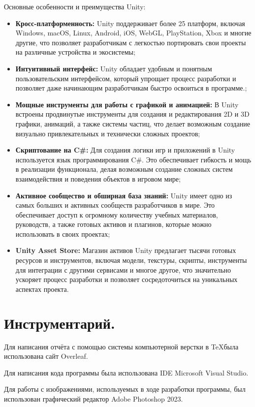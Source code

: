 Основные особенности и преимущества Unity:
\begin{itemize}
    \item \textbf{Кросс-платформенность:} Unity поддерживает более 25 платформ, включая Windows, macOS, Linux, Android, iOS, WebGL, PlayStation, Xbox и многие другие, что позволяет разработчикам с легкостью портировать свои проекты на различные устройства и экосистемы;
    \item \textbf{Интуитивный интерфейс:} Unity обладает удобным и понятным пользовательским интерфейсом, который упрощает процесс разработки и позволяет даже начинающим разработчикам быстро освоиться в программе.;
    \item \textbf{Мощные инструменты для работы с графикой и анимацией:} В Unity встроены продвинутые инструменты для создания и редактирования 2D и 3D графики, анимаций, а также системы частиц, что делает возможным создание визуально привлекательных и технически сложных проектов;
    \item \textbf{Скриптование на C#:} Для создания логики игр и приложений в Unity используется язык программирования C#. Это обеспечивает гибкость и мощь в реализации функционала, делая возможным создание сложных систем взаимодействия и поведения объектов в игровом мире;
    \item \textbf{Активное сообщество и обширная база знаний:} Unity имеет одно из самых больших и активных сообществ разработчиков в мире. Это обеспечивает доступ к огромному количеству учебных материалов, руководств, а также готовых активов и плагинов, которые можно использовать в своих проектах;
    \item \textbf{Unity Asset Store:} Магазин активов Unity предлагает тысячи готовых ресурсов и инструментов, включая модели, текстуры, скрипты, инструменты для интеграции с другими сервисами и многое другое, что значительно ускоряет процесс разработки и позволяет сосредоточиться на уникальных аспектах проекта.
\end{itemize}


\section{\label{sec:ch01/sec03}Инструментарий.}
Для написания отчёта с помощью системы компьютерной верстки в \TeX была использована сайт Overleaf.

Для написания кода программы была использована IDE Microsoft Visual Studio.

Для работы с изображениями, используемых в ходе разработки программы, был использован графический редактор Adobe Photoshop 2023.

